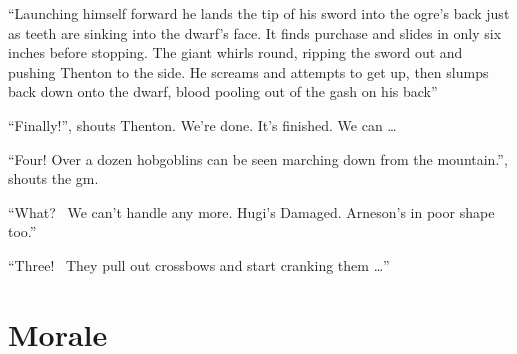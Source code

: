 \begin{multicols}{2}
{\begin{exampletext}
		``Launching himself forward he lands the tip of his sword into the ogre's back just as teeth are sinking into the dwarf's face. It finds purchase and slides in only six inches before stopping. The giant whirls \gls{round}, ripping the sword out and pushing Thenton to the side. He screams and attempts to get up, then slumps back down onto the dwarf, blood pooling out of the gash on his back''

``Finally!'', shouts Thenton. We're done. It's finished. We can {\dots}

``Four! Over a dozen hobgoblins can be seen marching down from the mountain.'', shouts the \gls{gm}.

``What? \ We can't handle any more. Hugi's Damaged. Arneson's in poor shape too.''

``Three! \ They pull out crossbows and start cranking them {\dots}''
	\end{exampletext}}{}

\end{multicols}

\section{Morale}
\newcommand{\moralechart}{
	\begin{tcolorbox}[title={Morale Chart},arc=1mm,tabularx={cp{.75\textwidth}}]
		\gls{tn} & Situation \\\hline

		-4 & Monsters outnumber characters 3:1. \\

		-2 & Monsters outnumber characters 2:1. \\

		+2 & Characters outnumber the monsters. \\

		+2 & Monster is wounded. \\

		-2 & Character's top Strength Bonus is lower than the monster's.  \\

		+2 & Character's top Strength Bonus is higher than the monster's.  \\

		+1 & Players have displayed awesome magical abilities. \\

	\end{tcolorbox}
}

